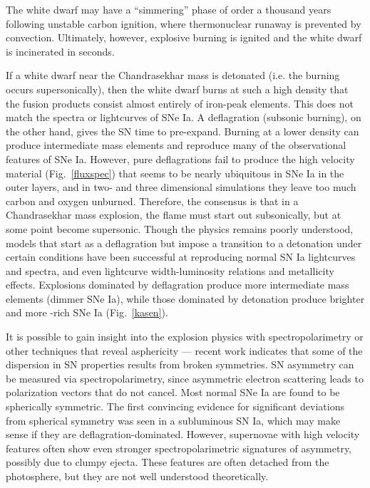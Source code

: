 \documentclass{nature1}
\begin{document}
The white dwarf may have a ``simmering'' phase
of order a thousand years following unstable carbon ignition, where
thermonuclear runaway is prevented by
convection\citep{2008ApJ...678.1158P}.  Ultimately, however, explosive
burning is ignited and the white dwarf is incinerated in seconds.  

If a white dwarf near the Chandrasekhar mass is detonated (i.e. the
burning occurs supersonically), then the white dwarf burns at such a
high density that the fusion products consist almost entirely of
iron-peak elements\citep{1969Ap&SS...5..180A}.  This does not match
the spectra or lightcurves of SNe Ia.  A deflagration (subsonic
burning), on the other hand, gives the SN time to pre-expand.  Burning
at a lower density can produce intermediate mass elements and
reproduce many of the observational features of SNe
Ia\citep{1984ApJ...286..644N}.  However, pure deflagrations fail to
produce the high velocity material (Fig.~\ref{fluxspec}) that seems to be
nearly ubiquitous in SNe Ia in the outer
layers\citep{2005ApJ...623L..37M}, and in two- and three dimensional
simulations they leave too much carbon and oxygen
unburned\citep{2005ApJ...623..337G}.  Therefore, the consensus is that
in a Chandrasekhar mass explosion, the flame must start out
subsonically, but at some point become
supersonic\citep{1991A&A...245..114K}.  Though the physics remains
poorly understood, models that start as a deflagration but impose a
transition to a detonation under certain conditions have been
successful at reproducing normal SN Ia lightcurves and
spectra\citep{1993A&A...270..223K}, and even lightcurve
width-luminosity relations and metallicity
effects\citep{2009Natur.460..869K}.  Explosions dominated by
deflagration produce more intermediate mass elements (dimmer SNe Ia),
while those dominated by detonation produce brighter and more \Ni
-rich SNe Ia (Fig.~\ref{kasen})\citep{2009Natur.460..869K}.

It is possible to gain insight into the explosion physics with
spectropolarimetry or other techniques that reveal asphericity ---
recent work indicates that some of the dispersion in SN properties
results from broken symmetries\citep{2009Natur.460..869K}.  SN
asymmetry can be measured via spectropolarimetry, since asymmetric
electron scattering leads to polarization vectors that do not cancel.
Most normal SNe Ia are found to be spherically
symmetric\citep{2005ApJ...632..450L,2008ARA&A..46..433W}.  The first
convincing evidence for significant deviations from spherical symmetry
was seen in a subluminous SN Ia\citep{2001ApJ...556..302H}, which may
make sense if they are deflagration-dominated.  However, supernovae
with high velocity features often show even stronger
spectropolarimetric signatures of asymmetry, possibly due to clumpy
ejecta\citep{2003ApJ...593..788K,2005ApJ...632..450L}.  These features
are often detached from the photosphere, but they are not well
understood theoretically.  
\end{document}
